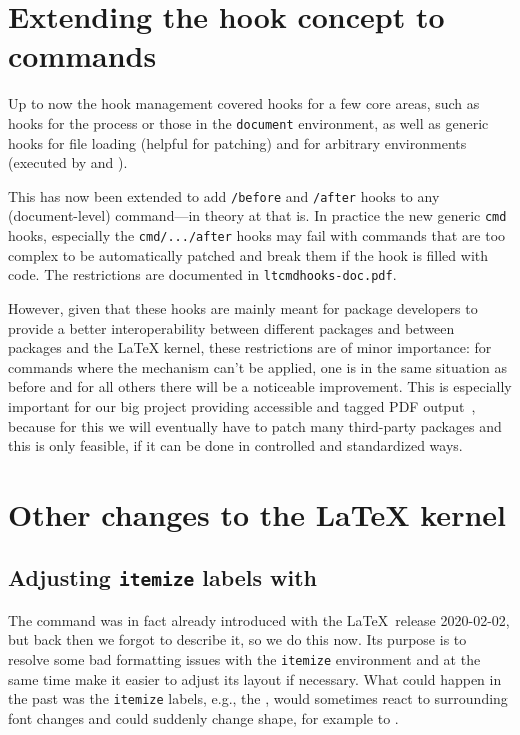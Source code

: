 \documentclass{ltnews}
\providecommand\hook[1]{\texttt{#1}}
\providecommand\env[1]{\texttt{#1}}
\providecommand\env[1]{\texttt{#1}}
\begin{document}
\section{Extending the hook concept to commands}

Up to now the hook management covered hooks for a few core areas, such
as hooks for the  process or those in the \env{document}
environment, as well as generic hooks for file loading (helpful for
patching) and for arbitrary environments (executed by  and
).

This has now been extended to add \hook{/before} and \hook{/after}
hooks to any (document-level) command---in theory at that is.  In
practice the new generic \hook{cmd} hooks, especially the
\hook{cmd/.../after} hooks may fail with commands that are too complex
to be automatically patched and break them if the hook is filled with
code.  The restrictions are documented in \texttt{ltcmdhooks-doc.pdf}.

However, given that these hooks are mainly meant for package
developers to provide a better interoperability between different
packages and between packages and the \LaTeX{} kernel, these
restrictions are of minor importance: for commands where the mechanism
can't be applied, one is in the same situation as before and for all
others there will be a noticeable improvement.  This is especially
important for our big project providing accessible and tagged PDF
output~\cite{33:blueprint}, because for this we will eventually have
to patch many third-party packages and this is only feasible, if it can
be done in controlled and standardized ways.




\section{Other changes to the \LaTeX{} kernel}

\subsection{Adjusting \env{itemize} labels with }

The command  was in fact already introduced with the
\LaTeX\ release 2020-02-02, but back then we forgot to describe it, so
we do this now. Its purpose is to resolve some bad formatting issues
with the \env{itemize} environment and at the same time make it easier
to adjust its layout if necessary. What could happen in the past was the
\env{itemize} labels, e.g., the \textbullet{}, would sometimes react to
surrounding font changes and could suddenly change shape, for example
to \textit{\textbullet}.
\end{document}

